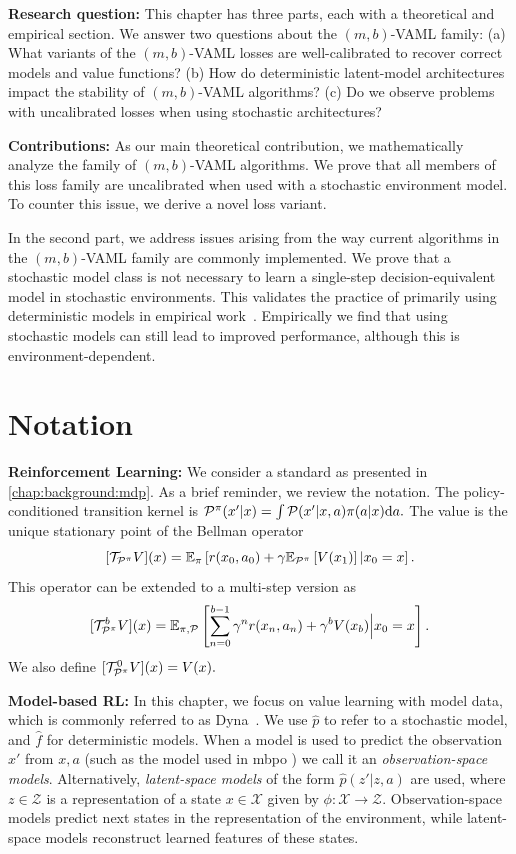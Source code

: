 \textbf{Research question:} This chapter has three parts, each with a theoretical and empirical section. We answer two questions about the $(m,b)$-VAML family: (a) What variants of the $(m,b)$-VAML losses are well-calibrated to recover correct models and value functions? (b) How do deterministic latent-model architectures impact the stability of $(m,b)$-VAML algorithms? (c) Do we observe problems with uncalibrated losses when using stochastic architectures?

\textbf{Contributions:} 
As our main theoretical contribution, we mathematically analyze the family of $(m,b)$-VAML algorithms.
We prove that all members of this loss family are uncalibrated when used with a stochastic environment model.
To counter this issue, we derive a novel loss variant.

In the second part, we address issues arising from the way current algorithms in the $(m,b)$-VAML family are commonly implemented.
We prove that a stochastic model class is not necessary to learn a single-step decision-equivalent model in stochastic environments.
This validates the practice of primarily using deterministic models in empirical work~\parencite{oh2017value,schrittwieser2020mastering,hansen2022temporal}.
Empirically we find that using stochastic models can still lead to improved performance, although this is environment-dependent.


\section{Notation}

\textbf{Reinforcement Learning:} We consider a standard as presented in \autoref{chap:background:mdp}.
As a brief reminder, we review the notation.
The policy-conditioned transition kernel is $\P^\pi(x'|x) = \int \P(x'|x,a) \pi(a|x) \mathrm{d} a.$
The value is the unique stationary point of the Bellman operator $$[\mathcal{T}_{\P^\pi} V](x) = \EEX{\pi}{r(x_0,a_0) + \gamma  \EEX{\P^\pi}{V(x_1)}|x_0=x}.$$
This operator can be extended to a multi-step version as $$[{\mathcal{T}}^b_{\P^\pi} V](x) = \EEX{\pi,\P}{\sum_{n=0}^{b-1} \gamma^n r(x_n,a_n) + \gamma^b {V(x_b)}\Big|x_0=x}.$$
We also define $[\mathcal{T}_{\P^\pi}^0 V](x) = V(x).$

\textbf{Model-based RL:} In this chapter, we focus on value learning with model data, which is commonly referred to as Dyna~\parencite{dyna}.
We use $\hat{p}$ to refer to a stochastic model, and $\hat{f}$ for deterministic models.
When a model is used to predict the observation $x'$ from $x,a$ (such as the model used in \ac{mbpo} \parencite{mbpo}) we call it an \emph{observation-space models}.
Alternatively, \emph{latent-space models} of the form $\hat{p}(z'|z, a)$ are used, where $z\in\mathcal{Z}$ is a representation of a state $x\in\mathcal{X}$ given by $\phi: \mathcal{X} \rightarrow \mathcal{Z}$.
Observation-space models predict next states in the representation of the environment, while latent-space models reconstruct learned features of these states.

